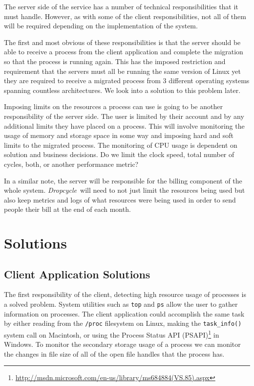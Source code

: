 \documentclass[12pt, a4paper]{article}
\def\dropcycle{\emph{Dropcycle}\ }
\begin{document}
The server side of the service has a number of technical responsibilities that
it must handle. However, as with some of the client responsibilities, not all
of them will be required depending on the implementation of the system.

The first and most obvious of these responsibilities is that the server should
be able to receive a process from the client application and complete the
migration so that the process is running again. This has the imposed
restriction and requirement that the servers must all be running the same
version of Linux yet they are required to receive a migrated process from
3 different operating systems spanning countless architectures. We look into
a solution to this problem later.

Imposing limits on the resources a process can use is going to be another
responsibility of the server side. The user is limited by their account and by
any additional limits they have placed on a process. This will involve
monitoring the usage of memory and storage space in some way and imposing hard
and soft limits to the migrated process. The monitoring of CPU usage is
dependent on solution and business decisions. Do we limit the clock speed,
total number of cycles, both, or another performance metric?

In a similar note, the server will be responsible for the billing component of
the whole system. \dropcycle will need to not just limit the resources being
used but also keep metrics and logs of what resources were being used in order
to send people their bill at the end of each month.

\section{Solutions}

\subsection{Client Application Solutions}

The first responsibility of the client, detecting high resource usage of
processes is a solved problem. System utilities such as \texttt{top} and
\texttt{ps} allow the user to gather information on processes. The client
application could accomplish the same task by either reading from the
\texttt{/proc} filesystem on Linux, making the \texttt{task\_info()} system
call on Macintosh, or using the Process Status API
(PSAPI)\footnote{\url{http://msdn.microsoft.com/en-us/library/ms684884(VS.85).aspx}}
in Windows. To monitor the secondary storage usage of a process we can monitor
the changes in file size of all of the open file handles that the process has.
\end{document}
